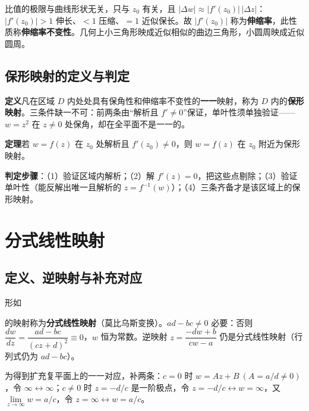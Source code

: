 
比值的极限与曲线形状无关，只与 \(z_{0}\) 有关，且 \(|\Delta w|\approx|f'(z_{0})|\,|\Delta z|\)：\(|f'(z_{0})|>1\) 伸长、\(<1\) 压缩、\(=1\) 近似保长。故 \(|f'(z_{0})|\) 称为\textbf{伸缩率}，此性质称\textbf{伸缩率不变性}。几何上小三角形映成近似相似的曲边三角形，小圆周映成近似圆周。

\subsection{保形映射的定义与判定}

\textbf{定义}\quad 凡在区域 \(D\) 内处处具有保角性和伸缩率不变性的\textbf{一一}映射，称为 \(D\) 内的\textbf{保形映射}。三条件缺一不可：前两条由“解析且 \(f'\neq0\)”保证，单叶性须单独验证——\(w=z^{2}\) 在 \(z\neq0\) 处保角，却在全平面不是一一的。

\textbf{定理}\quad 若 \(w=f(z)\) 在 \(z_{0}\) 处解析且 \(f'(z_{0})\neq0\)，则 \(w=f(z)\) 在 \(z_{0}\) 附近为保形映射。

\textbf{判定步骤}：（1）验证区域内解析；（2）解 \(f'(z)=0\)，把这些点剔除；（3）验证单叶性（能反解出唯一且解析的 \(z=f^{-1}(w)\)）；（4）三条齐备才是该区域上的保形映射。


\section{分式线性映射}

\subsection{定义、逆映射与补充对应}

形如


的映射称为\textbf{分式线性映射}（莫比乌斯变换）。\(ad-bc\neq0\) 必要：否则 \(\dfrac{dw}{dz}=\dfrac{ad-bc}{(cz+d)^{2}}\equiv0\)，\(w\) 恒为常数。逆映射 \(z=\dfrac{-dw+b}{cw-a}\) 仍是分式线性映射（行列式仍为 \(ad-bc\)）。

为得到扩充复平面上的一一对应，补两条：\(c=0\) 时 \(w=Az+B\ (A=a/d\neq0)\)，令 \(\infty\leftrightarrow\infty\)；\(c\neq0\) 时 \(z=-d/c\) 是一阶极点，令 \(z=-d/c\leftrightarrow w=\infty\)，又 \(\lim\limits_{z\to\infty}w=a/c\)，令 \(z=\infty\leftrightarrow w=a/c\)。

